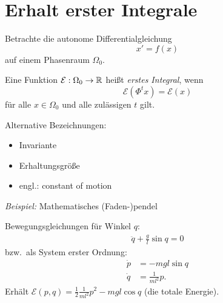 \section{Erhalt erster Integrale}

Betrachte die autonome Differentialgleichung
\begin{equation*}
	x'=f(x)
\end{equation*}
auf einem Phasenraum $\Omega_0$.

\begin{definition}
 Eine Funktion $\mathcal E:\Omega_0\to\mathbb R$ heißt \emph{erstes Integral}, wenn
 \begin{equation*}
		\mathcal E(\Phi^t x) = \mathcal E(x)
	\end{equation*}
 für alle $x\in\Omega_0$ und alle zulässigen $t$ gilt.
\end{definition}

	Alternative Bezeichnungen:
	\begin{itemize}
		\item Invariante
		\item Erhaltungsgröße
 \item engl.: constant of motion
	\end{itemize}

\emph{Beispiel:} Mathematisches (Faden-)pendel\\
\begin{figure}[h]
\begin{center}
\end{center}
\end{figure}

Bewegungsgleichungen für Winkel $q$:
\begin{align*}
 \ddot{q} + \frac{g}{l} \sin q = 0
\end{align*}
bzw.\ als System erster Ordnung:
\begin{align*}
\dot{p} &= - mgl \sin q\\
\dot{q} &= \frac{1}{ml^2} p.
\end{align*}
Erhält $\mathcal E(p,q) = \frac{1}{2} \frac{1}{ml^2} p^2 - mgl \cos q $ (die totale Energie).\\

